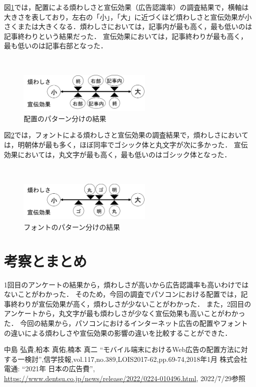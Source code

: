 \documentclass[twocolumn,10pt,a4j]{ltjsarticle}
\begin{document}
図\ref{fig:結果1}では，配置による煩わしさと宣伝効果（広告認識率）の調査結果で，横軸は大きさを表しており，左右の「小」，「大」に近づくほど煩わしさと宣伝効果が小さくまたは大きくなる．煩わしさにおいては，記事内が最も高く，最も低いのは記事終わりという結果だった．
宣伝効果においては，記事終わりが最も高く，最も低いのは記事右部となった．

　
\begin{figure}[h]
\begin{center}
 \includegraphics[clip,width=65mm,height=20mm]{結果1.png}
\end{center}
 \caption{配置のパターン分けの結果}
 \label{fig:結果1}
\end{figure}

図\ref{fig:結果2}では，フォントによる煩わしさと宣伝効果の調査結果で，煩わしさにおいては，明朝体が最も多く，ほぼ同率でゴシック体と丸文字が次に多かった．
宣伝効果においては，丸文字が最も高く，最も低いのはゴシック体となった．

　
\begin{figure}[h]
\begin{center}
 \includegraphics[clip,width=65mm,height=20mm]{結果2.png}
\end{center}
 \caption{フォントのパターン分けの結果}
 \label{fig:結果2}
\end{figure}

\section{考察とまとめ}
1回目のアンケートの結果から，煩わしさが高いから広告認識率も高いわけではないことがわかった．
そのため，今回の調査でパソコンにおける配置では，記事終わりが宣伝効果が高く，煩わしさが少ないことがわかった．
また，2回目のアンケートから，丸文字が最も煩わしさが少なく宣伝効果も高いことがわかった．
今回の結果から，パソコンにおけるインターネット広告の配置やフォントの違いによる煩わしさや宣伝効果の影響の違いを比較することができた．

\begin{thebibliography}{99}
 中島 弘貴,柗本 真佑,楠本 真二 ``モバイル端末におけるWeb広告の配置方法に対する一検討'',信学技報,vol.117,no.389,LOIS2017-62,pp.69-74,2018年1月
 株式会社電通: ``2021年 日本の広告費'', \url{https://www.dentsu.co.jp/news/release/2022/0224-010496.html}, 2022/7/29参照
\end{thebibliography}
\end{document}
